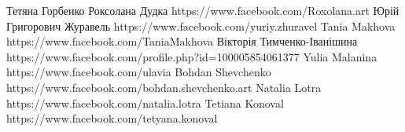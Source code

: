  
 
 
 
 

Тетяна Горбенко
Роксолана Дудка https://www.facebook.com/Roxolana.art
Юрій Григорович Журавель https://www.facebook.com/yuriy.zhuravel
Tania Makhova https://www.facebook.com/TaniaMakhova
Вікторія Тимченко-Іванішина https://www.facebook.com/profile.php?id=100005854061377
Yulia Malanina https://www.facebook.com/ulavia
Bohdan Shevchenko https://www.facebook.com/bohdan.shevchenko.art
Natalia Lotra https://www.facebook.com/natalia.lotra
Tetiana Konoval https://www.facebook.com/tetyana.konoval

